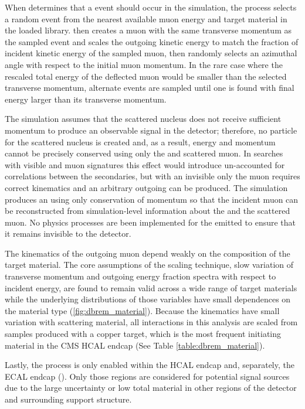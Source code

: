 When \gf determines that a \dbrem event should occur in the simulation, the process selects a random event from the nearest available muon energy and target material in the loaded \mg library. 
\gf then creates a muon with the same transverse momentum as the sampled event and scales the outgoing kinetic energy to match the fraction of incident kinetic energy of the sampled muon, then randomly selects an azimuthal angle with respect to the initial muon momentum. 
In the rare case where the rescaled total energy of the deflected muon would be smaller than the selected transverse momentum, alternate events are sampled until one is found with final energy larger than its transverse momentum. 

The simulation assumes that the scattered nucleus does not receive sufficient momentum to produce an observable signal in the detector; therefore, no \gf particle for the scattered nucleus is created and, as a result, energy and momentum cannot be precisely conserved using only the \aprime and scattered muon. 
In searches with visible \aprime and muon signatures this effect would introduce un-accounted for correlations between the secondaries, but with an invisible \aprime only the muon requires correct kinematics and an arbitrary outgoing \aprime can be produced.  
The simulation produces an \aprime using only conservation of momentum so that the incident muon can be reconstructed from simulation-level information about the \aprime and the scattered muon.
No physics processes are been implemented for the emitted \aprime to ensure that it remains invisible to the detector.

The kinematics of the outgoing muon depend weakly on the composition of the target material.
The core assumptions of the scaling technique, slow variation of transverse momentum and outgoing energy fraction spectra with respect to incident energy, are found to remain valid across a wide range of target materials while the underlying distributions of those variables have small dependences on the material type (\cref{fig:dbrem_material}).
Because the kinematics have small variation with scattering material, all \dbrem interactions in this analysis are scaled from samples produced with a copper target, which is the most frequent \dbrem initiating material in the CMS HCAL endcap (See Table \ref{table:dbrem_material}).

Lastly, the process is only enabled within the HCAL endcap and, separately, the ECAL endcap ().
Only those regions are considered for potential signal sources due to the large uncertainty or low total material in other regions of the detector and surrounding support structure.

